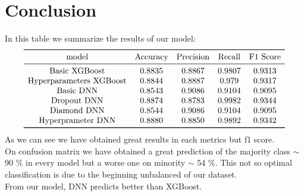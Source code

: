 \documentclass[french]{scrartcl}
\begin{document}
\section{Conclusion}
In this table we summarize the results of our model:
\[
\begin{array}{ccccc}
	\toprule
	\text{model} & \text{Accuracy} & \text{Precision} & \text{Recall} & \text{F1 Score}   \\
	\midrule
	\text{Basic XGBoost} & 0.8835 & 0.8867 & 0.9807 & 0.9313 \\
	\text{Hyperparameters XGBoost} & 0.8844 & 0.8887 & 0.979 & 0.9317 \\
	\text{Basic DNN} & 0.8543 & 0.9086 & 0.9104 & 0.9095 \\
	\text{Dropout DNN} & 0.8874 & 0.8783 & 0.9982 & 0.9344 \\
	\text{Diamond DNN} & 0.8544 & 0.9086 & 0.9104 & 0.9095 \\
	\text{Hyperprameter DNN} & 0.8880 & 0.8850 & 0.9892 & 0.9342 \\
	\bottomrule
\end{array}
\]
As we can see we have obtained great results in each metrics but f1 score.\\
On confusion matrix we have obtained a great prediction of the majority class $\sim$ 90 $\%$ in every model but a worse one on minority $\sim$ 54 $\%$.
This not so optimal classification is due to the beginning unbalanced of our dataset.\\
From our model, DNN predicts better than XGBoost.
\end{document}
